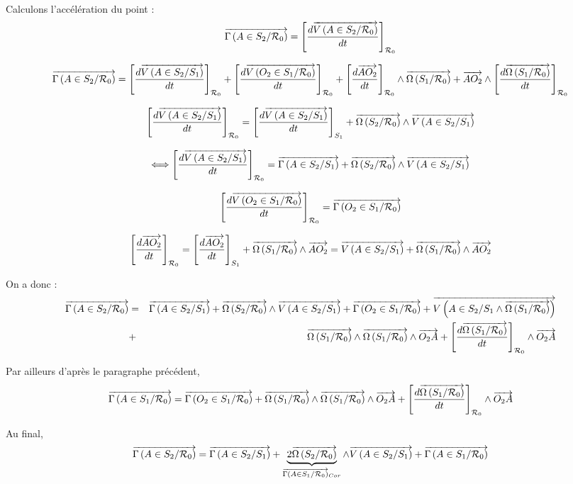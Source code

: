 \documentclass[11pt,oneside]{article}
\begin{document}
Calculons l'accélération du point : 
$$
\vectg{A}{S_2}{\mathcal{R}_0}=
\left[
\dfrac{d\vectv{A}{S_2}{\mathcal{R}_0}}{dt}
\right]_{\mathcal{R}_0}
$$

$$
\vectg{A}{S_2}{\mathcal{R}_0}
=
\left[
\dfrac{d
\vectv{A}{S_2}{S_1} }{dt}
\right]_{\mathcal{R}_0}
+ 
\left[
\dfrac{d\vectv{O_2}{S_1}{\mathcal{R}_0}}{dt}
\right]_{\mathcal{R}_0}
+
\left[
\dfrac{d\vect{AO_2}}{dt}
\right]_{\mathcal{R}_0}
\wedge 
\vecto{S_1}{\mathcal{R}_0}
+
\vect{AO_2}
\wedge 
\left[
\dfrac{d\vecto{S_1}{\mathcal{R}_0}}{dt}
\right]_{\mathcal{R}_0}
$$


$$
\left[
\dfrac{d
\vectv{A}{S_2}{S_1} }{dt}
\right]_{\mathcal{R}_0}
=
\left[
\dfrac{d
\vectv{A}{S_2}{S_1} }{dt}
\right]_{S_1}
+
\vecto{S_2}{\mathcal{R}_0}\wedge\vectv{A}{S_2}{S_1}
$$

$$
\Longleftrightarrow
\left[
\dfrac{d
\vectv{A}{S_2}{S_1} }{dt}
\right]_{\mathcal{R}_0}
=
\vectg{A}{S_2}{S_1} 
+
\vecto{S_2}{\mathcal{R}_0}\wedge\vectv{A}{S_2}{S_1}
$$


$$
\left[
\dfrac{d\vectv{O_2}{S_1}{\mathcal{R}_0}}{dt}
\right]_{\mathcal{R}_0} 
= \vectg{O_2}{S_1}{\mathcal{R}_0}
$$

$$
\left[
\dfrac{d\vect{AO_2}}{dt}
\right]_{\mathcal{R}_0}
=
\left[
\dfrac{d\vect{AO_2}}{dt}
\right]_{S_1}
+
\vecto{S_1}{\mathcal{R}_0}
\wedge 
\vect{AO_2}
=
\vectv{A}{S_2}{S_1}+
\vecto{S_1}{\mathcal{R}_0}
\wedge 
\vect{AO_2}
$$


On a donc : 
\begin{eqnarray*}
\vectg{A}{S_2}{\mathcal{R}_0}
&=&
\vectg{A}{S_2}{S_1} + \vecto{S_2}{\mathcal{R}_0}\wedge\vectv{A}{S_2}{S_1}
+\vectg{O_2}{S_1}{\mathcal{R}_0}
+\vectv{A}{S_2}{S_1\wedge \vecto{S_1}{\mathcal{R}_0}}\\
&+&\vecto{S_1}{\mathcal{R}_0} \wedge \vecto{S_1}{\mathcal{R}_0} \wedge \vect{O_2A}
+
\left[
\dfrac{d\vecto{S_1}{\mathcal{R}_0}}{dt}
\right]_{\mathcal{R}_0}
\wedge 
\vect{O_2A}
\end{eqnarray*}

Par ailleurs d'après le paragraphe précédent, 
$$
\vectg{A}{S_1}{\mathcal{R}_0} 
= \vectg{O_2}{S_1}{\mathcal{R}_0} 
+\vecto{S_1}{\mathcal{R}_0} \wedge \vecto{S_1}{\mathcal{R}_0}
\wedge \vect{O_2A}
+\left[\dfrac{d\vecto{S_1}{\mathcal{R}_0}}{dt}\right]_{\mathcal{R}_0} \wedge \vect{O_2A} 
$$

Au final, 
$$
\vectg{A}{S_2}{\mathcal{R}_0}
=
\vectg{A}{S_2}{S_1} + \underbrace{2\vecto{S_2}{\mathcal{R}_0}}_{\vectg{A}{S_1}{\mathcal{R}_0}_{Cor}}\wedge\vectv{A}{S_2}{S_1}
+\vectg{A}{S_1}{\mathcal{R}_0} 
$$
\end{document}
